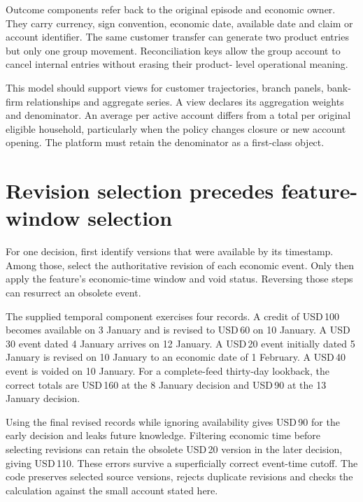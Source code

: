 Outcome components refer back to the original episode and economic owner.
They carry currency, sign convention, economic date, available date and
claim or account identifier. The same customer transfer can generate two
product entries but only one group movement. Reconciliation keys allow the
group account to cancel internal entries without erasing their product-
level operational meaning.

This model should support views for customer trajectories, branch panels,
bank-firm relationships and aggregate series. A view declares its
aggregation weights and denominator. An average per active account differs
from a total per original eligible household, particularly when the policy
changes closure or new account opening. The platform must retain the
denominator as a first-class object.

\section{Revision selection precedes feature-window selection}
For one decision, first identify versions that were available by its
timestamp. Among those, select the authoritative revision of each economic
event. Only then apply the feature's economic-time window and void status.
Reversing those steps can resurrect an obsolete event.

The supplied temporal component exercises four records. A credit of
USD\,100 becomes available on 3 January and is revised to USD\,60 on
10 January. A USD\,30 event dated 4 January arrives on 12 January.
A USD\,20 event initially dated 5 January is revised on 10 January to
an economic date of 1 February. A USD\,40 event is voided on 10 January.
For a complete-feed thirty-day lookback, the correct totals are
USD\,160 at the 8 January decision and USD\,90 at the 13 January decision.

Using the final revised records while ignoring availability gives USD\,90
for the early decision and leaks future knowledge. Filtering economic
time before selecting revisions can retain the obsolete USD\,20 version
in the later decision, giving USD\,110. These errors survive a superficially
correct event-time cutoff. The code preserves selected source versions,
rejects duplicate revisions and checks the calculation against the small
account stated here.

